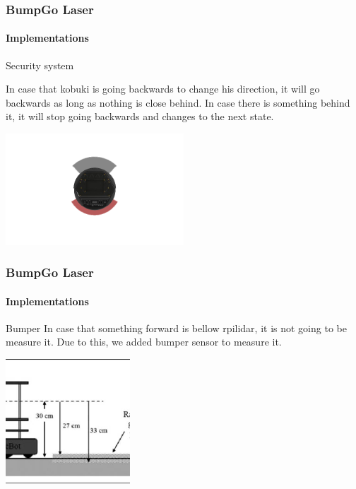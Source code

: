 \documentclass{beamer}
\begin{document}
\begin{frame}
\frametitle{BumpGo Laser}
\framesubtitle{Implementations}

\begin{block}{Security system}
	
	In case that kobuki is going backwards to change his direction, it will  go 			backwards as long as nothing is close behind.
	In case there is something behind it, it will stop going backwards and changes to the next state.

\end{block}
\centering
\includegraphics[width=0.5\textwidth]{angle.jpeg}

\end{frame}


\begin{frame}
\frametitle{BumpGo Laser}
\framesubtitle{Implementations}

\begin{block}{Bumper}
	In case that something forward is bellow rpilidar, it is not going to be measure it. Due to this, we added bumper sensor to measure it.

\end{block}

\centering
\includegraphics[width=0.35\textwidth]{levels.jpeg}



\end{frame}



\end{document}
